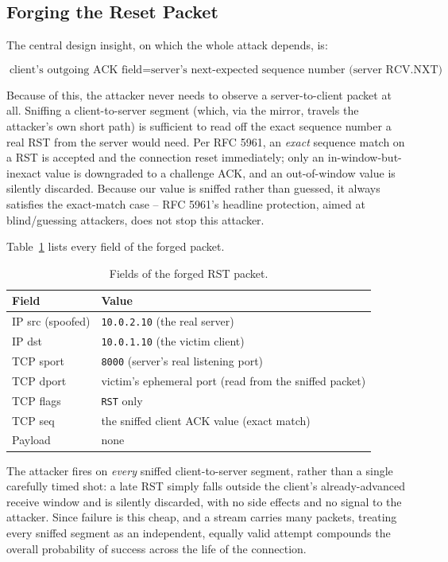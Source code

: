 \documentclass[11pt]{article}
\begin{document}
\subsection{Forging the Reset Packet}
\label{sec:forge}

The central design insight, on which the whole attack depends, is:

\begin{equation}
\text{client's outgoing ACK field} = \text{server's next-expected sequence number (server RCV.NXT)}
\end{equation}

Because of this, the attacker never needs to observe a server-to-client
packet at all. Sniffing a client-to-server segment (which, via the
mirror, travels the attacker's own short path) is sufficient to read off
the exact sequence number a real RST from the server would need. Per RFC
5961, an \emph{exact} sequence match on a RST is accepted and the
connection reset immediately; only an in-window-but-inexact value is
downgraded to a challenge ACK, and an out-of-window value is silently
discarded. Because our value is sniffed rather than guessed, it always
satisfies the exact-match case -- RFC 5961's headline protection, aimed
at blind/guessing attackers, does not stop this attacker.

Table~\ref{tab:packet} lists every field of the forged packet.

\begin{table}[h]
\centering\small
\begin{tabular}{ll}
\toprule
Field & Value \\
\midrule
IP src (spoofed) & \texttt{10.0.2.10} (the real server) \\
IP dst & \texttt{10.0.1.10} (the victim client) \\
TCP sport & \texttt{8000} (server's real listening port) \\
TCP dport & victim's ephemeral port (read from the sniffed packet) \\
TCP flags & \texttt{RST} only \\
TCP seq & the sniffed client ACK value (exact match) \\
Payload & none \\
\bottomrule
\end{tabular}
\caption{Fields of the forged RST packet.}
\label{tab:packet}
\end{table}

The attacker fires on \emph{every} sniffed client-to-server segment,
rather than a single carefully timed shot: a late RST simply falls
outside the client's already-advanced receive window and is silently
discarded, with no side effects and no signal to the attacker. Since
failure is this cheap, and a stream carries many packets, treating every
sniffed segment as an independent, equally valid attempt compounds the
overall probability of success across the life of the connection.
\end{document}
